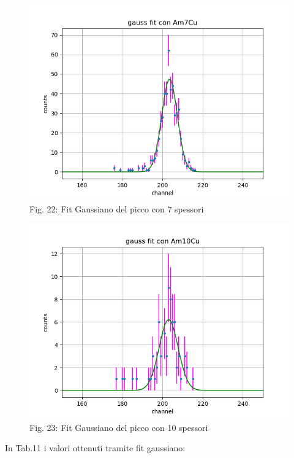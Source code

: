 \documentclass[a4paper]{article}
\begin{document}
\begin{figure}[H]
	\includegraphics[width=1\textwidth]{gauss_fit_con_Am7Cutext}
        \caption{Fig. 22: Fit Gaussiano del picco con 7 spessori}
        \label{fig:22}
	\end{figure} 
	\begin{figure}
	
	
	\includegraphics[width=1\textwidth]{gauss_fit_con_Am10Cutext}
        \caption{Fig. 23: Fit Gaussiano del picco con 10 spessori}
        \label{fig:23}        
\end{figure}  


\newpage

In Tab.11 i valori ottenuti tramite fit gaussiano:
\end{document}
